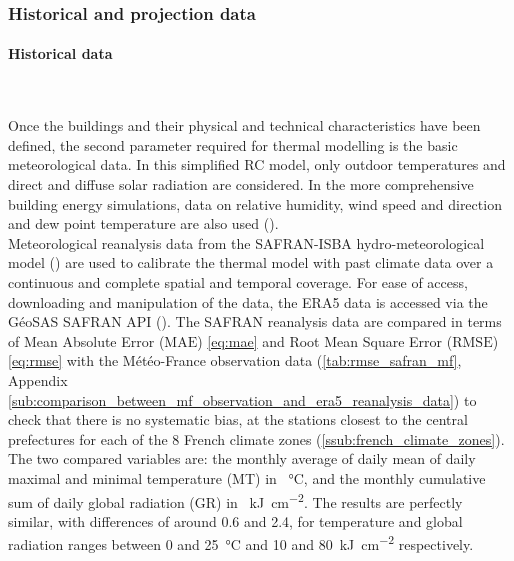 \documentclass[11pt]{article}
\begin{document}
        
        \subsubsection{Historical and projection data} %
        \label{ssub:historical_data}
        
        \paragraph{Historical data}\mbox{}\\ %
        \label{par:historical_data}
        
        Once the buildings and their physical and technical characteristics have been defined, the second parameter required for thermal modelling is the basic meteorological data. In this simplified RC model, only outdoor temperatures and direct and diffuse solar radiation are considered. In the more comprehensive building energy simulations, data on relative humidity, wind speed and direction and dew point temperature are also used (\cite{bhandari_evaluation_2012}).\\

        Meteorological reanalysis data from the SAFRAN-ISBA hydro-meteorological model (\cite{habets_safran-isba-modcou_2008}) are used to calibrate the thermal model with past climate data over a continuous and complete spatial and temporal coverage. For ease of access, downloading and manipulation of the data, the ERA5 data is accessed via the GéoSAS SAFRAN API (\cite{bera_geosas_2015}). The SAFRAN reanalysis data are compared in terms of Mean Absolute Error ($\mathrm{MAE}$) \eqref{eq:mae} and Root Mean Square Error ($\mathrm{RMSE}$) \eqref{eq:rmse} with the Météo-France observation data (\ref{tab:rmse_safran_mf}, Appendix \ref{sub:comparison_between_mf_observation_and_era5_reanalysis_data}) to check that there is no systematic bias, at the stations closest to the central prefectures for each of the 8 French climate zones (\ref{ssub:french_climate_zones}). The two compared variables are: the monthly average of daily mean of daily maximal and minimal temperature (MT) in \SI{}{\celsius}, and the monthly cumulative sum of daily global radiation (GR) in \SI{}{\kilo\joule\per\square\centi\meter}. The results are perfectly similar, with differences of around \num{0.6} and \num{2.4}, for temperature and global radiation ranges between 0 and \SI{25}{\celsius} and 10 and \SI{80}{\kilo\joule\per\square\centi\meter} respectively. 
\end{document}
